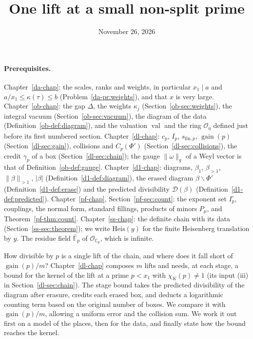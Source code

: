 \documentclass[reqno]{amsart}
\title{One lift at a small non-split prime}
\author{}
\date{November 26, 2026}
\newcounter{chap}
\theoremstyle{plain}
\theoremstyle{definition}
\theoremstyle{remark}
\newcommand{\C}{{\mathbb{C}}}
\newcommand{\Oc}{\mathcal O}
\newcommand{\Dc}{\mathcal D}
\newcommand{\val}{\operatorname{val}}
\newcommand{\gain}{\operatorname{gain}}
\newcommand{\sfp}{s_{\mathrm{fin},p}}
\newcommand{\Heis}{\mathrm{Heis}}
\newcommand{\nb}[1]{\lVert #1 \rVert}
\newcommand{\bo}{\beta_1}
\newcommand{\bl}{\beta_{>1}}
\newcommand{\bb}{\nb{\beta}_{>1}}
\begin{document}
\maketitle
{}\label{chap}

\paragraph{Prerequisites.}
Chapter~\ref{da-chap}: the scales, ranks and weights, in particular \(x_1 \mid a\) and \(a/x_1 \le \kappa(\tau) \le b\) (Problem~\ref{da-pr:weights}), and that \(x\) is very large.  Chapter~\ref{ob-chap}: the gap \(\Delta\), the weights \(\kappa_j\) (Section~\ref{ob-sec:weights}), the integral vacuum (Section~\ref{ob-sec:vacuum}), the diagram of the data (Definition~\ref{ob-def:diagram}), and the valuation \(\val\) and the ring \(\Oc_\eta\) defined just before its first numbered section.  Chapter~\ref{dl-chap}: \(c_p\), \(I_p\), \(\sfp\), \(\gain(p)\) (Section~\ref{dl-sec:gain}), collisions and \(C_p(\Phi')\) (Section~\ref{dl-sec:collisions}), the credit \(\gamma_p\) of a box (Section~\ref{dl-sec:chain}); the gauge \(\nb{\omega}_g\) of a Weyl vector is that of Definition~\ref{ob-def:gauge}.  Chapter~\ref{d1-chap}: diagrams, \(\bo\), \(\bl\), \(\bb\), \(\lvert\beta\rvert\) (Definition~\ref{d1-def:diagram}), the erased diagram \(\beta \smallsetminus \Phi'\) (Definition~\ref{d1-def:erase}) and the predicted divisibility \(\Dc(\beta)\) (Definition~\ref{d1-def:predicted}).  Chapter~\ref{pf-chap}, Section~\ref{pf-sec:count}: the exponent set \(I_p^\circ\), couplings, the normal form, standard fillings, products of minors \(P_\mu\), and Theorem~\ref{pf-thm:count}.  Chapter~\ref{ss-chap}: the definite chain with its data (Section~\ref{ss-sec:theorem}); we write \(\Heis(y)\) for the finite Heisenberg translation by \(y\).  The residue field \(\bar{\mathbb F}_p\) of \(\Oc_{\C_p}\), which is infinite.

\medskip
How divisible by \(p\) is a single lift of the chain, and where does it fall short of \(\gain(p)/m\)?  Chapter~\ref{dl-chap} composes \(m\) lifts and needs, at each stage, a bound for the kernel of the lift at a prime \(p < x_1\) with \(\chi_K(p) \ne 1\) (its input (iii) in Section~\ref{dl-sec:chain}).  The stage bound takes the predicted divisibility of the diagram after erasure, credits each erased box, and deducts a logarithmic counting term based on the original number of boxes.  We compare it with \(\gain(p)/m\), allowing a uniform error and the collision sum.  We work it out first on a model of the places, then for the data, and finally state how the bound reaches the kernel.
\end{document}
